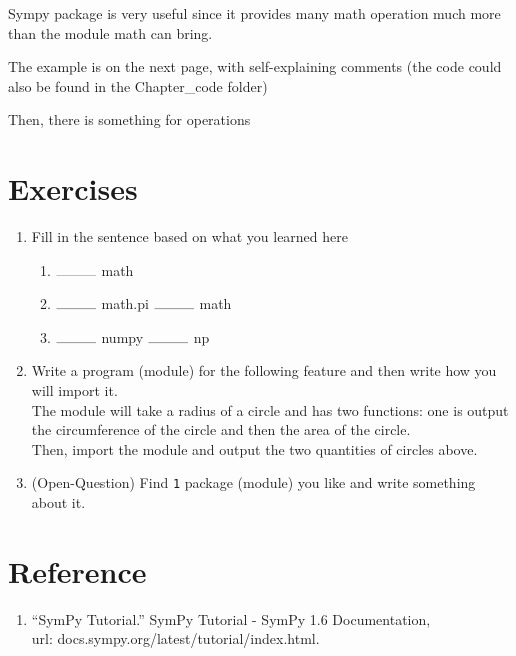 \documentclass[12pt]{article}
\begin{document}
Sympy package is very useful since it provides many math operation much more than the module math can bring.

The example is on the next page, with self-explaining comments (the code could
also be found in the Chapter\_code folder)

\newpage


Then, there is something for operations



\section{Exercises}
\begin{enumerate}
	\item Fill in the sentence based on what you learned here
		\begin{enumerate}
			\item $\rule{1cm}{0.10mm}$ math
			\item $\rule{1cm}{0.10mm}$ math.pi $\rule{1cm}{0.10mm}$ math
			\item $\rule{1cm}{0.10mm}$ numpy $\rule{1cm}{0.10mm}$ np
		\end{enumerate}
	\item Write a program (module) for the following feature and then write how you will import it.
		\\ The module will take a radius of a circle and has two functions: one is output the circumference of the circle and then the area of the circle.
		\\ Then, import the module and output the two quantities of circles above.
	\item (Open-Question) Find \texttt{1} package (module) you like and write something about it.
\end{enumerate}
\newpage
\section{Reference}
\begin{enumerate}
	\item “SymPy Tutorial.” SymPy Tutorial - SymPy 1.6 Documentation, \\ url: docs.sympy.org/latest/tutorial/index.html.
\end{enumerate}
\end{document}
